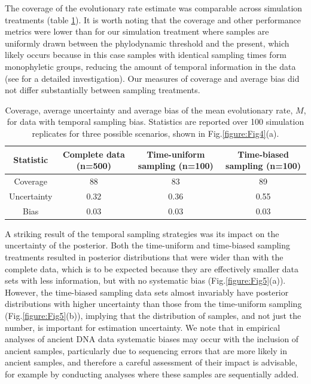 \documentclass[11pt]{article}
\begin{document}
The coverage of the evolutionary rate estimate was comparable across simulation treatments (table \ref{table:sampling_bias}). It is worth noting that the coverage and other performance metrics were lower than for our simulation treatment where samples are uniformly drawn between the phylodynamic threshold and the present, which likely occurs because in this case samples with identical sampling times form monophyletic groups, reducing the amount of temporal information in the data (see \citealt{murray2016effect} for a detailed investigation). Our measures of coverage and average bias did not differ substantially between sampling treatments. 

\begin{table}[H]
	\caption{Coverage, average uncertainty and average bias of the mean evolutionary rate, $M$, for data with temporal sampling bias. Statistics are reported over 100 simulation replicates for three possible scenarios, shown in Fig.\ref{figure:Fig4}(a).} 
	\begin{center}
		\label{table:sampling_bias}
		\begin{tabular}{ c|c|c|c }
		 Statistic & Complete data (n=500) & Time-uniform sampling (n=100) & Time-biased sampling (n=100) \\ 
		\hline
		Coverage 	& 88   & 83   & 89 \\ 
		Uncertainty & 0.32 & 0.36 & 0.55 \\
		Bias 		& 0.03 & 0.03 & 0.03 \\ 
		\end{tabular}
	\end{center}
\end{table}

A striking result of the temporal sampling strategies was its impact on the uncertainty of the posterior. Both the time-uniform and time-biased sampling treatments resulted in posterior distributions that were wider than with the complete data, which is to be expected because they are effectively smaller data sets with less information, but with no systematic bias (Fig.\ref{figure:Fig5}(a)). However, the time-biased sampling data sets almost invariably have posterior distributions with higher uncertainty than those from the time-uniform sampling (Fig.\ref{figure:Fig5}(b)), implying that the distribution of samples, and not just the number, is important for estimation uncertainty. We note that in empirical analyses of ancient DNA data systematic biases may occur with the inclusion of ancient samples, particularly due to sequencing errors that are more likely in ancient samples, and therefore a careful assessment of their impact is advisable, for example by conducting analyses where these samples are sequentially added.
\end{document}
